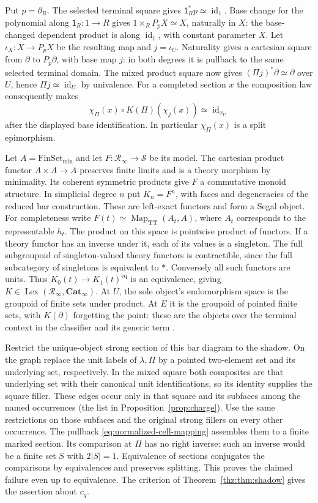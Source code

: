 \documentclass[oneside]{article}
\theoremstyle{plain}
\theoremstyle{definition}
\theoremstyle{remark}
\newcommand{\Cat}{\mathbf{Cat}_{\infty}}
\newcommand{\Lex}{\operatorname{Lex}}
\newcommand{\Map}{\operatorname{Map}}
\newcommand{\RNU}{\mathcal R_{\infty}}
\newcommand{\Sps}{\mathcal S}
\newcommand{\TT}{\mathbf{TT}}
\newcommand{\id}{\operatorname{id}}
\newcommand{\minrep}{\mathrm{min}}
\begin{document}
Put $p=\partial_R$. The selected terminal square gives
$\mathsf1_R^*p\simeq\id_1$. Base change for the polynomial along
$\mathsf1_R:1\to R$ gives
$1\times_R P_p X\simeq X$, naturally in $X$: the base-changed
dependent product is along $\id_1$, with constant parameter $X$.
Let $\iota_X:X\to P_pX$ be the resulting map and $j=\iota_U$.
Naturality gives a cartesian square from $\partial$ to $P_p\partial$,
with base map $j$: in both degrees it is pullback to the same selected
terminal domain. The mixed product square now gives
$(\Pi j)^*\partial\simeq\partial$ over $U$, hence
$\Pi j\simeq\id_U$ by univalence. For a completed section $x$ the
composition law consequently makes
\[
 \chi_\Pi(x)\circ K(\Pi)(\chi_j(x))\simeq \id_{x_U}
\]
after the displayed base identification. In particular $\chi_\Pi(x)$
is a split epimorphism.

Let $A=\mathrm{FinSet}_{\minrep}$ and let $F:\RNU\to\Sps$ be its model.
The cartesian product functor $A\times A\to A$ preserves finite limits
and is a theory morphism by minimality. Its coherent symmetric products
give $F$ a commutative monoid structure. In simplicial degree $n$ put
$K_n=F^n$, with faces and degeneracies of the reduced bar construction.
These are left-exact functors and form a Segal object. For completeness
write $F(t)\simeq\Map_{\TT}(A_t,A)$, where $A_t$ corresponds to the
representable $h_t$. The product on this space is pointwise product of
functors. If a theory functor has an inverse under it, each of its
values is a singleton. The full subgroupoid of singleton-valued theory
functors is contractible, since the full subcategory of singletons is
equivalent to $*$. Conversely all such functors are units. Thus
$K_0(t)\to K_1(t)^{\mathrm{eq}}$ is an equivalence, giving
$K\in\Lex(\RNU,\Cat)$. At $U$, the sole object's endomorphism space is
the groupoid of finite sets under product. At $E$ it is the groupoid
of pointed finite sets, with $K(\partial)$ forgetting the point:
these are the objects over the terminal context in the classifier
and its generic term \cite[Def.~5.2, Thm.~5.29]{NguyenUemura2025}.

Restrict the unique-object strong section of this bar diagram to the
shadow. On the graph replace the unit labels of $\lambda,\Pi$ by a
pointed two-element set and its underlying set, respectively. In the
mixed square both composites are that underlying set with their
canonical unit identifications, so its identity supplies the square
filler. These edges occur only in that square and its subfaces among
the named occurrences (the list in Proposition~\ref{prop:charge}).
Use the same restrictions on those subfaces and the original strong
fillers on every other occurrence. The pullback
\eqref{eq:normalized-cell-mapping} assembles them to a finite marked
section. Its comparison at $\Pi$ has no right inverse: such an inverse
would be a finite set $S$ with $2|S|=1$. Equivalence of sections
conjugates the comparisons by equivalences and preserves splitting.
This proves the claimed failure even up to equivalence. The criterion
of Theorem~\ref{thz:thm:shadow} gives the assertion about $c_q$.
\end{document}
